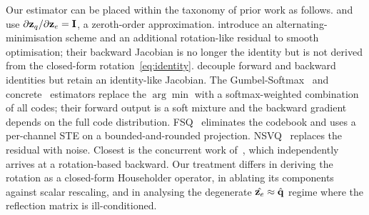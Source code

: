 Our estimator can be placed within the taxonomy of prior work as
follows. \citet{bengio2013ste} and \citet{vandenoord2017vqvae} use
$\partial \mathbf{z}_q / \partial \mathbf{z}_e = \mathbf{I}$, a zeroth-order
approximation. \citet{huh2023straighteningste} introduce an
alternating-minimisation scheme and an additional rotation-like
residual to smooth optimisation; their backward Jacobian is no
longer the identity but is not derived from the closed-form
rotation~\eqref{eq:identity}. \citet{shah2024decoupledste} decouple
forward and backward identities but retain an identity-like
Jacobian. The Gumbel-Softmax~\citep{jang2017gumbel} and
concrete~\citep{maddison2017concrete} estimators replace the
$\arg\min$ with a softmax-weighted combination of all codes; their
forward output is a soft mixture and the backward gradient depends on
the full code distribution. FSQ~\citep{mentzer2024fsq} eliminates the
codebook and uses a per-channel STE on a bounded-and-rounded
projection. NSVQ~\citep{vali2022nsvq} replaces the residual with
noise. Closest is the concurrent work of~\citet{fifty2024rotation},
which independently arrives at a rotation-based backward. Our
treatment differs in deriving the rotation as a closed-form
Householder operator, in ablating its components against scalar
rescaling, and in analysing the degenerate
$\hat{\mathbf{z}_e} \approx \hat{\mathbf{q}}$ regime where the reflection
matrix is ill-conditioned.

